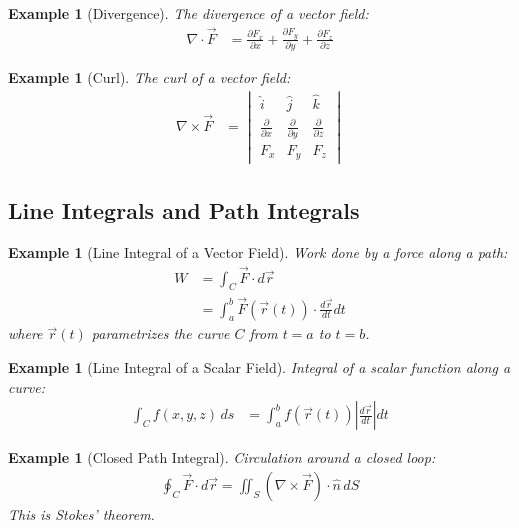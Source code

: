 \documentclass{article}
\newtheorem{example}[theorem]{Example}
\begin{document}
\begin{example}[Divergence]
The divergence of a vector field:
\begin{align*}
    \nabla \cdot \vec{F} &= \frac{\partial F_x}{\partial x} + \frac{\partial F_y}{\partial y} + \frac{\partial F_z}{\partial z}
\end{align*}
\end{example}

\begin{example}[Curl]
The curl of a vector field:
\begin{align*}
    \nabla \times \vec{F} &= \begin{vmatrix}
        \hat{i} & \hat{j} & \hat{k} \\
        \frac{\partial}{\partial x} & \frac{\partial}{\partial y} & \frac{\partial}{\partial z} \\
        F_x & F_y & F_z
    \end{vmatrix}
\end{align*}
\end{example}

\subsection{Line Integrals and Path Integrals}

\begin{example}[Line Integral of a Vector Field]
Work done by a force along a path:
\begin{align*}
    W &= \int_C \vec{F} \cdot d\vec{r} \\
    &= \int_a^b \vec{F}(\vec{r}(t)) \cdot \frac{d\vec{r}}{dt} dt
\end{align*}
where $\vec{r}(t)$ parametrizes the curve $C$ from $t=a$ to $t=b$.
\end{example}

\begin{example}[Line Integral of a Scalar Field]
Integral of a scalar function along a curve:
\begin{align*}
    \int_C f(x,y,z) \, ds &= \int_a^b f(\vec{r}(t)) \left|\frac{d\vec{r}}{dt}\right| dt
\end{align*}
\end{example}

\begin{example}[Closed Path Integral]
Circulation around a closed loop:
\begin{align*}
    \oint_C \vec{F} \cdot d\vec{r} = \iint_S (\nabla \times \vec{F}) \cdot \hat{n} \, dS
\end{align*}
This is Stokes' theorem.
\end{example}
\end{document}
